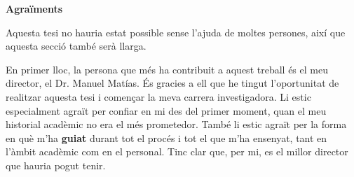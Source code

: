 \pagebreak
\thispagestyle{empty}

\begin{center}
    \textbf{\Large Agraïments}
\end{center}

Aquesta tesi no hauria estat possible sense l'ajuda de moltes persones, així
que aquesta secció també serà llarga.

En primer lloc, la persona que més ha contribuit a aquest treball és el meu
director, el Dr. Manuel Matías. És gracies a ell que he tingut l'oportunitat de
realitzar aquesta tesi i començar la meva carrera investigadora. Li estic
especialment agraït per confiar en mi des del primer moment, quan el meu
historial acadèmic no era el més prometedor. També li estic agraït per la forma
en què m'ha \textbf{guiat} durant tot el procés i tot el que m'ha ensenyat,
tant en l'àmbit acadèmic com en el personal. Tinc clar que, per mi, es el
millor director que hauria pogut tenir.

